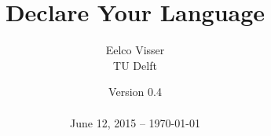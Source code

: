 \newcommand{\Version}{0.4}

\title{Declare Your Language}
	
\author{Eelco Visser\\[20pt]TU Delft\\[20pt]}
	
\date{Version \Version \\\ \\June 12, 2015 -- \today}
	



%




%
%
%



	

